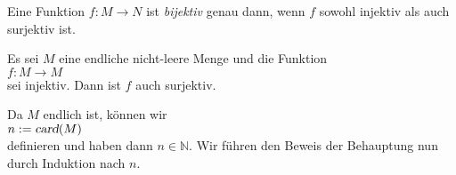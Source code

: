 \begin{Definition}[bijektiv] \lb
  Eine Funktion $f: M \rightarrow N$ ist \emph{bijektiv} genau dann, wenn
 $f$ sowohl injektiv als auch surjektiv ist.  
\eox
\end{Definition}

\begin{Satz}
  Es sei $M$ eine endliche nicht-leere Menge und die Funktion 
\\[0.2cm]
\hspace*{1.3cm}
$f:M \rightarrow M$
\\[0.2cm]
sei injektiv.  Dann ist $f$ auch surjektiv.
\eox
\end{Satz}

\proof
Da $M$ endlich ist, k\"{o}nnen wir
\\[0.2cm]
\hspace*{1.3cm}
$n := \textsl{card}(M)$
\\[0.2cm]
definieren und haben dann $n \in \mathbb{N}$.  Wir f\"{u}hren den Beweis der Behauptung nun durch
Induktion nach $n$.

